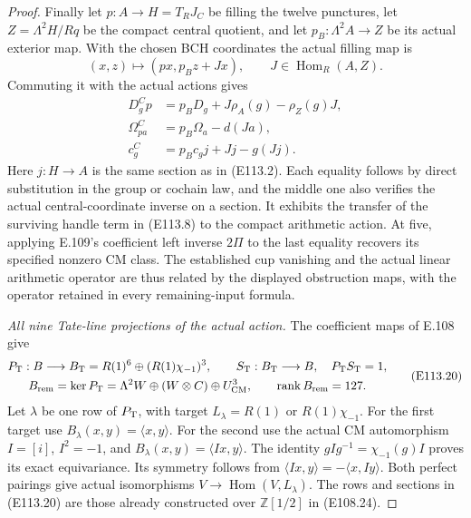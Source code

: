 \begin{proof}
Finally let $p:A\to H=T_RJ_C$ be filling the twelve punctures,
let $Z=\Lambda^2H/Rq$ be the compact central quotient, and let
$p_B:\Lambda^2A\to Z$ be its actual exterior map.
With the chosen BCH coordinates the actual filling map is
\[
 (x,z)\longmapsto(px,p_Bz+Jx),
                   \qquad J\in\operatorname{Hom}_R(A,Z).
 \tag{E113.18}
\]
Commuting it with the actual actions gives
\[
 \begin{split}
 D^C_gp&=p_BD_g+J\rho_A(g)-\rho_Z(g)J,\\
 \Omega^C_{pa}&=p_B\Omega_a-d(Ja),\\
 c^C_g&=p_Bc_gj+Jj-g(Jj).
 \end{split}
 \tag{E113.19}
\]
Here $j:H\to A$ is the same section as in (E113.2).
Each equality follows by direct substitution in the group or
cochain law, and the middle one also verifies the actual
central-coordinate inverse on a section.
It exhibits the transfer of the surviving handle term in
(E113.8) to the compact arithmetic action.  At five, applying
E.109's coefficient left inverse $2\Pi$ to the last equality
recovers its specified nonzero CM class.  The established cup
vanishing and the actual linear arithmetic operator are thus
related by the displayed obstruction maps, with the operator
retained in every remaining-input formula.

\emph{All nine Tate-line projections of the actual action.}
The coefficient maps of E.108 give
\[
 \begin{gathered}
 P_{\rm T}:B\longrightarrow
       B_{\rm T}=R(1)^6\oplus(R(1)\chi_{-1})^3,
 \qquad S_{\rm T}:B_{\rm T}\longrightarrow B,
 \quad P_{\rm T}S_{\rm T}=1,\\
 B_{\rm rem}=\ker P_{\rm T}
   =\Lambda^2W\oplus(W\otimes C)\oplus U_{\rm CM}^3,
 \qquad \operatorname{rank}B_{\rm rem}=127.
 \end{gathered}
 \tag{E113.20}
\]
Let $\lambda$ be one row of $P_{\rm T}$, with target
$L_\lambda=R(1)$ or $R(1)\chi_{-1}$.
For the first target use $B_\lambda(x,y)=\langle x,y\rangle$.
For the second use the actual CM automorphism
$I=[i]$, $I^2=-1$, and
$B_\lambda(x,y)=\langle Ix,y\rangle$.
The identity $gIg^{-1}=\chi_{-1}(g)I$ proves its exact
equivariance.  Its symmetry follows from
$\langle Ix,y\rangle=-\langle x,Iy\rangle$.
Both perfect pairings give actual isomorphisms
$V\longrightarrow\operatorname{Hom}(V,L_\lambda)$.
The rows and sections in (E113.20) are those already
constructed over $\mathbb Z[1/2]$ in (E108.24).


\end{proof}
